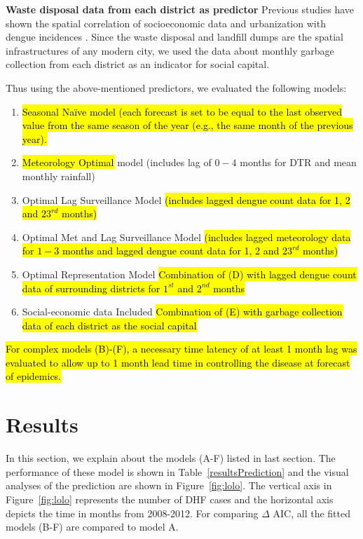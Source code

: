 \documentclass{bmcart}
\begin{document}
\textbf{Waste disposal data from each district as predictor} Previous studies have shown the spatial correlation of socioeconomic data and urbanization with dengue incidences \cite{mondini2008spatial,wu2009higher}. Since the waste disposal and landfill dumps are the spatial infrastructures of any modern city, we used the data about monthly garbage collection from each district as an indicator for social capital. 

Thus using the above-mentioned predictors, we evaluated the following models: 
\begin{enumerate}[label=(\Alph*)]
	\item \hl{Seasonal Na\"{i}ve model (each forecast is set to be equal to the last observed value from the same season of the year (e.g., the same month of the previous year).}
	\item \hl{Meteorology Optimal} model (includes lag of $0-4$ months for DTR and mean monthly rainfall)
	\item Optimal Lag Surveillance Model \hl{(includes lagged dengue count data for 1, 2 and $23^{rd}$ months)}
	\item Optimal Met and Lag Surveillance Model \hl{(includes lagged meteorology data for $1-3$ months and  lagged dengue count data for 1, 2 and $23^{rd}$ months)}
	\item Optimal Representation Model \hl{Combination of (D) with lagged dengue count data of surrounding districts for $1^{st}$ and $2^{nd}$ months} 
	\item Social-economic data Included \hl{Combination of (E) with garbage collection data of each district as the social capital} 
\end{enumerate}

\hl{For complex models (B)-(F), a necessary time latency of at least 1 month lag was evaluated to allow up to 1 month lead time in controlling the disease at forecast of epidemics.}




\section{Results} \label{results}


In this section, we explain about the models (A-F) listed in last section. The performance of these model is shown in Table~\ref{resultsPrediction} and the visual analyses of the prediction are shown in Figure~\ref{fig:lolo}. The vertical axis in Figure~\ref{fig:lolo} represents the number of DHF cases and the horizontal axis depicts the time in months from 2008-2012. For comparing  $\Delta$ AIC, all the fitted models (B-F) are compared to model A. 
\end{document}
